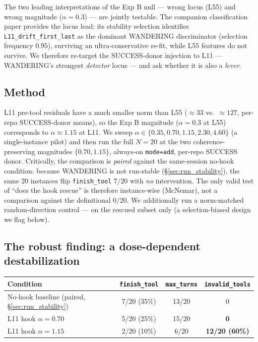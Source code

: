 \documentclass[11pt]{article}
\begin{document}
The two leading interpretations of the Exp B null --- wrong locus (L55) and wrong magnitude ($\alpha=0.3$) --- are jointly testable. The companion classification paper \cite{multichannel_2026} provides the locus lead: its stability selection identifies \texttt{L11\_drift\_first\_last} as the dominant WANDERING discriminator (selection frequency $0.95$), surviving an ultra-conservative re-fit, while L55 features do not survive. We therefore re-target the SUCCESS-donor injection to L11 --- WANDERING's strongest \emph{detector} locus --- and ask whether it is also a \emph{lever}.

\subsection{Method}

L11 pre-tool residuals have a much smaller norm than L55 ($\approx 33$ vs.\ $\approx 127$, per-repo SUCCESS-donor means), so the Exp B magnitude ($\alpha=0.3$ at L55) corresponds to $\alpha \approx 1.15$ at L11. We sweep $\alpha \in \{0.35, 0.70, 1.15, 2.30, 4.60\}$ (a single-instance pilot) and then run the full $N=20$ at the two coherence-preserving magnitudes $\{0.70, 1.15\}$, always-on \texttt{mode=add}, per-repo SUCCESS donor. Critically, the comparison is \emph{paired} against the same-session no-hook condition: because WANDERING is not run-stable (\S\ref{sec:run_stability}), the same 20 instances flip \texttt{finish\_tool} $7/20$ with \emph{no} intervention. The only valid test of ``does the hook rescue'' is therefore instance-wise (McNemar), not a comparison against the definitional $0/20$. We additionally run a norm-matched random-direction control --- on the rescued subset only (a selection-biased design we flag below).

\subsection{The robust finding: a dose-dependent destabilization}

\begin{center}
\begin{tabular}{lccc}
\toprule
Condition & \texttt{finish\_tool} & \texttt{max\_turns} & \texttt{invalid\_tools} \\
\midrule
No-hook baseline (paired, \S\ref{sec:run_stability}) & 7/20 (35\%) & 13/20 & 0 \\
L11 hook $\alpha=0.70$ & 5/20 (25\%) & 15/20 & \textbf{0} \\
L11 hook $\alpha=1.15$ & 2/20 (10\%) & 6/20 & \textbf{12/20 (60\%)} \\
\bottomrule
\end{tabular}
\end{center}
\end{document}
